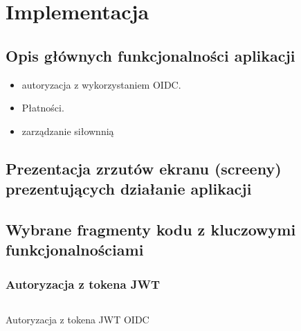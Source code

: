 \documentclass[../../spr.tex]{subfiles}
\begin{document}
\section{Implementacja}

\subsection{Opis głównych funkcjonalności aplikacji}

\begin{itemize}
  \item autoryzacja z wykorzystaniem OIDC.
  \item Płatności.
  \item zarządzanie siłownnią
\end{itemize}

\subsection{Prezentacja zrzutów ekranu (screeny) prezentujących działanie aplikacji}

\subsection{Wybrane fragmenty kodu z kluczowymi funkcjonalnościami}


\subsubsection{Autoryzacja z tokena JWT}

\begin{listing}
  \inputminted[breaklines, fontsize=\footnotesize, breakanywhere, firstline=18, numbers=left]
  {java}{./GymJwtAuthenticationConverter.java}
  \caption{Autoryzacja z tokena JWT OIDC}
\end{listing}

\subsubsection{}
\end{document}
